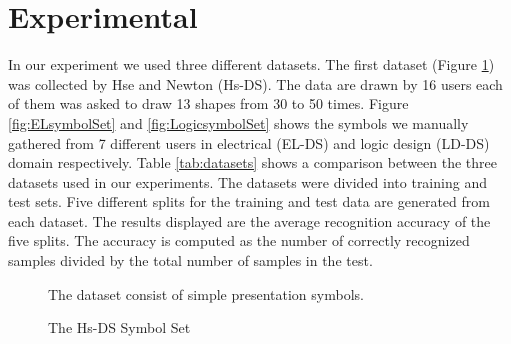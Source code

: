 \documentclass[preprint,10pt,5p,twocolumn]{elsarticle}
\begin{document}
\section{Experimental}
\label{sec:Experiments} 
In our experiment we used three different datasets. The first dataset (Figure \ref{fig:HsSet}) was collected by Hse and Newton\cite{HeloiseBeautification} (Hs-DS). The data are drawn by 16 users each of them was asked to draw 13 shapes from 30 to 50 times. Figure \ref{fig:ELsymbolSet} and \ref{fig:LogicsymbolSet} shows the symbols we manually gathered from 7 different users in electrical (EL-DS) and logic design (LD-DS) domain respectively.  Table \ref{tab:datasets} shows a comparison between the three datasets used in our experiments. The datasets were divided into training and test sets. Five different splits for the training and test data are generated from each dataset. The results displayed are the average recognition accuracy of the five splits. The accuracy is computed as the number of correctly recognized samples divided by the total number of samples in the test. 
\begin{figure}
\centering 

		\caption{The Hs-DS Symbol Set} The dataset consist of simple presentation symbols.
		\label{fig:HsSet} 
\end{figure}
\end{document}

